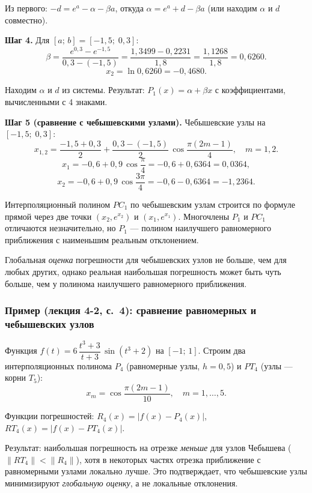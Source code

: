 Из первого: $-d = e^a - \alpha - \beta a$, откуда $\alpha = e^a + d - \beta a$ (или находим $\alpha$ и $d$ совместно).

\textbf{Шаг 4.} Для $[a;\,b] = [-1{,}5;\; 0{,}3]$:
\[
    \beta = \frac{e^{0{,}3} - e^{-1{,}5}}{0{,}3 - (-1{,}5)} = \frac{1{,}3499 - 0{,}2231}{1{,}8} = \frac{1{,}1268}{1{,}8} = 0{,}6260.
\]
\[
    x_2 = \ln 0{,}6260 = -0{,}4680.
\]

Находим $\alpha$ и $d$ из системы. Результат: $P_1(x) = \alpha + \beta x$ с коэффициентами, вычисленными с 4 знаками.

\textbf{Шаг 5 (сравнение с чебышевскими узлами).} Чебышевские узлы на $[-1{,}5;\; 0{,}3]$:
\[
    x_{1,2} = \frac{-1{,}5 + 0{,}3}{2} + \frac{0{,}3 - (-1{,}5)}{2}\,\cos\frac{\pi(2m-1)}{4}, \quad m = 1, 2.
\]
\[
    x_1 = -0{,}6 + 0{,}9\,\cos\frac{\pi}{4} = -0{,}6 + 0{,}6364 = 0{,}0364,
\]
\[
    x_2 = -0{,}6 + 0{,}9\,\cos\frac{3\pi}{4} = -0{,}6 - 0{,}6364 = -1{,}2364.
\]

Интерполяционный полином $PC_1$ по чебышевским узлам строится по формуле прямой через две точки $(x_2, e^{x_2})$ и $(x_1, e^{x_1})$. Многочлены $P_1$ и $PC_1$ отличаются незначительно, но $P_1$ --- полином наилучшего равномерного приближения с наименьшим реальным отклонением.

Глобальная \textit{оценка} погрешности для чебышевских узлов не больше, чем для любых других, однако реальная наибольшая погрешность может быть чуть больше, чем у полинома наилучшего равномерного приближения.


\subsubsection*{Пример (лекция 4-2, с.~4): сравнение равномерных и чебышевских узлов}

Функция $f(t) = 6\,\dfrac{t^3 + 3}{t + 3}\,\sin(t^3 + 2)$ на $[-1;\,1]$. Строим два интерполяционных полинома $P_4$ (равномерные узлы, $h = 0{,}5$) и $PT_4$ (узлы --- корни $T_5$):
\[
    x_m = \cos\frac{\pi(2m-1)}{10}, \quad m = 1, \ldots, 5.
\]

Функции погрешностей: $R_4(x) = |f(x) - P_4(x)|$, $RT_4(x) = |f(x) - PT_4(x)|$.

Результат: наибольшая погрешность на отрезке \textit{меньше} для узлов Чебышева ($\|RT_4\| < \|R_4\|$), хотя в некоторых частях отрезка приближение с равномерными узлами локально лучше. Это подтверждает, что чебышевские узлы минимизируют \textit{глобальную оценку}, а не локальные отклонения.

